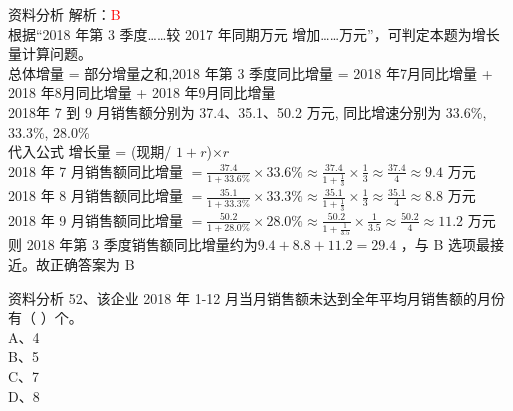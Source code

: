 \documentclass[aspectratio=169]{beamer}
\begin{document}
\begin{frame}[t]{资料分析}
    解析：\textcolor{red}{B}\\
    根据“2018 年第 3 季度……较 2017 年同期万元 增加……万元”，可判定本题为增长量计算问题。\\
    总体增量 = 部分增量之和,2018 年第 3 季度同比增量 = 2018 年7月同比增量 + 2018 年8月同比增量  + 2018 年9月同比增量 \\
    2018年 7 到 9  月销售额分别为 37.4、35.1、50.2 万元, 同比增速分别为 33.6\%, 33.3\%, 28.0\% \\

    代入公式 增长量 = (现期/ $1+r$)$\times  r$ \\

    2018 年 7 月销售额同比增量 $=  \frac{37.4}{1+33.6\%} \times 33.6\% \approx  \frac{37.4}{1+\frac{1}{3}} \times \frac{1}{3} \approx \frac{37.4}{4} \approx 9.4 $ 万元\\
    2018 年 8 月销售额同比增量 $=  \frac{35.1}{1+33.3\%} \times 33.3\% \approx  \frac{35.1}{1+\frac{1}{3}} \times \frac{1}{3} \approx \frac{35.1}{4} \approx 8.8 $ 万元\\
    2018 年 9 月销售额同比增量 $=  \frac{50.2}{1+28.0\%} \times 28.0\% \approx  \frac{50.2}{1+\frac{1}{3.5}} \times \frac{1}{3.5} \approx \frac{50.2}{4} \approx 11.2 $ 万元\\
    则 2018 年第 3 季度销售额同比增量约为$9.4+8.8+11.2=29.4$ ，与 B 选项最接近。故正确答案为 B\\
\end{frame}                           





\begin{frame}[t]{资料分析}
    52、该企业 2018 年 1-12 月当月销售额未达到全年平均月销售额的月份有（ ）个。  \\
    A、4                                                                         \\
    B、5                                                                         \\
    C、7                                                                         \\ 
    D、8                                                                         \\
\end{frame}                           
\end{document}
